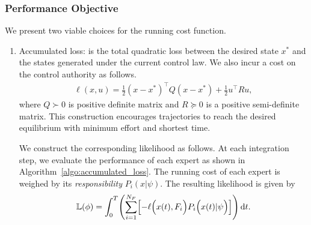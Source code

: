 \subsubsection{Performance Objective}
\label{sssec:performance_objective}
%
We present two viable choices for the running cost function. 
\begin{enumerate}
    \item Accumulated loss: is the total quadratic loss between the desired
    state $x^*$ and the states generated under the current control law. We also
    incur a cost on the control authority as follows.
    \begin{equation}
        \begin{gathered}
            \ell(x, u) = \frac{1}{2}(x - x^*)^\top Q (x - x^*) + \frac{1}{2} u^\top R u , 
        \end{gathered}
    \label{eq:accumulatedLoss}
    \end{equation}
    \noindent where $Q \succ 0$ is positive definite matrix and $R \succeq 0$ is
    a positive semi-definite matrix.
    This construction encourages trajectories to reach the desired equilibrium
    with minimum effort and shortest time.

    We construct the corresponding likelihood as follows.
    At each integration step, we evaluate the performance of each expert as
    shown in Algorithm~\ref{algo:accumulated_loss}.
    The running cost of each expert is weighed by its \textit{responsibility} $P_i(x | \psi)$.
    The resulting likelihood is given by
    \begin{align}
        \mathbb{L}(\phi) = \int_{0}^{T} \Biggl( \sum_{i=1}^{N_F} \Bigl[ - \ell \Bigl(x(t), F_i \Bigr) P_i\Bigl(x(t) | \psi \Bigr) \Bigr] \Biggr) \operatorname{d}\! t.
        \label{eq:accumulated_likelihood}
    \end{align}


\end{enumerate}
